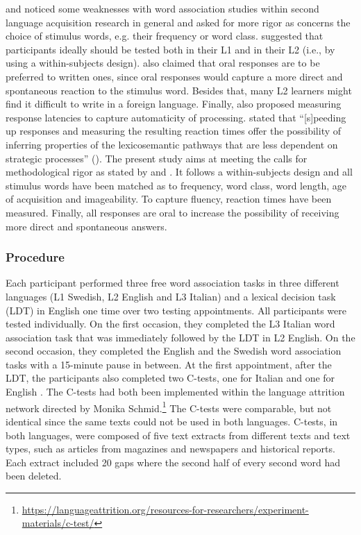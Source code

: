 \documentclass[output=paper,colorlinks,citecolor=brown,nonflat]{langsci/langscibook}
\begin{document}
\citet{Fitzpatrick2006} and \citet{FitzpatrickEtAl2013} noticed some weaknesses with word association studies within second language acquisition research in general and asked for more rigor as concerns the choice of stimulus words, e.g. their frequency or word class. \citet[200]{CremerEtAl2010} suggested that participants ideally should be tested both in their L1 and in their L2 (i.e., by using a within-subjects design). \citeauthor{CremerEtAl2010} also claimed that oral responses are to be preferred to written ones, since oral responses would capture a more direct and spontaneous reaction to the stimulus word. Besides that, many L2 learners might find it difficult to write in a foreign language. Finally, \citeauthor{CremerEtAl2010} also proposed measuring response latencies to capture automaticity of processing. \citeauthor{FitzpatrickIzura2011} stated that “[s]peeding up responses and measuring the resulting reaction times offer the possibility of inferring properties of the lexicosemantic pathways that are less dependent on strategic processes” (\citeyear[376]{FitzpatrickIzura2011}). The present study aims at meeting the calls for methodological rigor as stated by \citeauthor{FitzpatrickEtAl2013} and \citeauthor{CremerEtAl2010}. It follows a within-subjects design and all stimulus words have been matched as to frequency, word class, word length, age of acquisition and imageability. To capture fluency, reaction times have been measured. Finally, all responses are oral to increase the possibility of receiving more direct and spontaneous answers.

\subsubsection{Procedure}\label{sec:gudmundson:2.2.1}

Each participant performed three free word association tasks in three different languages (L1 Swedish, L2 English and L3 Italian) and a lexical decision task (LDT) in English one time over two testing appointments. All participants were tested individually. On the first occasion, they completed the L3 Italian word association task that was immediately followed by the LDT in L2 English. On the second occasion, they completed the English and the Swedish word association tasks with a 15-minute pause in between. At the first appointment, after the LDT, the participants also completed two C-tests, one for Italian \citep{Kras2007} and one for English \citep{Keijzer2007}. The C-tests had both been implemented within the language attrition network directed by Monika Schmid.\footnote{\url{https://languageattrition.org/resources-for-researchers/experiment-materials/c-test/}} The C-tests were comparable, but not identical since the same texts could not be used in both languages. C-tests, in both languages, were composed of five text extracts from different texts and text types, such as articles from magazines and newspapers and historical reports. Each extract included 20 gaps where the second half of every second word had been deleted.
\end{document}
